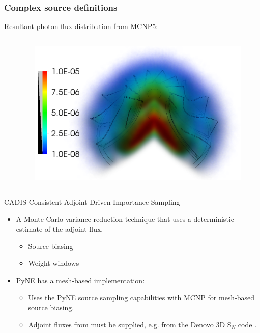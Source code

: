 \documentclass[xcolor=x11names,compress]{beamer}
\begin{document}
\begin{frame}
\frametitle{Complex source definitions}
Resultant photon flux distribution from MCNP5:
\begin{columns}[c]

\centering
\begin{column}{0.1\textwidth}
\end{column}

\begin{column}{0.8\textwidth}
\hspace{-0.85cm}
\centerline{\includegraphics[height=7cm]{turbine_flux.png}}
\end{column}
\end{columns}

\end{frame}

\begin{frame}{CADIS}
Consistent Adjoint-Driven Importance Sampling \cite{haghighat_monte_2003}
    \begin{itemize}
        \item{A Monte Carlo variance reduction technique that uses a deterministic estimate of the adjoint flux.}
        \begin{itemize}
            \item{Source biasing}
            \item{Weight windows}
        \end{itemize}
        \item{PyNE has a mesh-based implementation:}
        \begin{itemize}
            \item{Uses the PyNE source sampling capabilities with MCNP for mesh-based source biasing.}
            \item{Adjoint fluxes from must be supplied, e.g. from the Denovo 3D S$_N$ code \cite{Evans2010}.}
        \end{itemize}    
    \end{itemize}
\end{frame}
\end{document}
